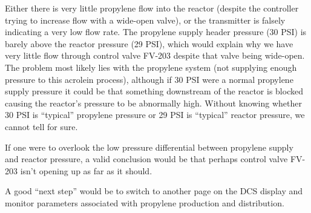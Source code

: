 Either there is very little propylene flow into the reactor (despite the controller trying to increase flow with a wide-open valve), or the transmitter is falsely indicating a very low flow rate.  The propylene supply header pressure (30 PSI) is barely above the reactor pressure (29 PSI), which would explain why we have very little flow through control valve FV-203 despite that valve being wide-open.  The problem most likely lies with the propylene system (not supplying enough pressure to this acrolein process), although if 30 PSI were a normal propylene supply pressure it could be that something downstream of the reactor is blocked causing the reactor's pressure to be abnormally high.  Without knowing whether 30 PSI is ``typical'' propylene pressure or 29 PSI is ``typical'' reactor pressure, we cannot tell for sure.  

If one were to overlook the low pressure differential between propylene supply and reactor pressure, a valid conclusion would be that perhaps control valve FV-203 isn't opening up as far as it should.

\vskip 10pt

A good ``next step'' would be to switch to another page on the DCS display and monitor parameters associated with propylene production and distribution.  





